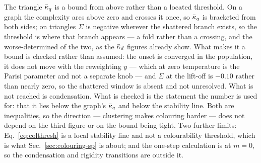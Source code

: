 The triangle $\bar\kappa_{q}$ is a bound from above rather than a located threshold. On a
graph the complexity arcs above zero and crosses it once, so $\bar\kappa_{q}$ is
bracketed from both sides; on triangles $\Sigma$ is negative wherever the
shattered branch exists, so the threshold is where that branch appears --- a fold
rather than a crossing, and the worse-determined of the two, as the $\bar\kappa_{d}$
figures already show. What makes it a bound is checked rather than assumed:
the onset is converged in the population, it does not move with the
reweighting $y$ --- which at zero temperature is the Parisi parameter and not
a separate knob --- and $\Sigma$ at the lift-off is $-0.10$ rather than nearly
zero, so the shattered window is absent and not unresolved. What is not
reached is condensation. What is checked is the statement the number is used
for:
that it lies below the graph's $\bar\kappa_{q}$ and below the stability line. Both are
inequalities, so the direction --- clustering makes colouring harder --- does not
depend on the third figure or on the bound being tight. Two further limits:
Eq.~\eqref{eq:colthresh} is a local stability line and not a colourability
threshold, which is what Sec.~\ref{sec:colouring-sp} is about; and the one-step
calculation is at $m=0$, so the condensation and rigidity transitions are
outside it.
